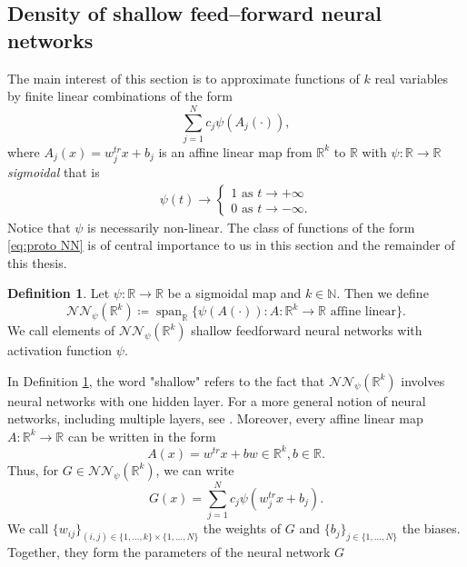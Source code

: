 \documentclass[11pt,a4paper,twoside,openany]{report}
\numberwithin{equation}{section}
\theoremstyle{plain} %
\theoremstyle{definition} %
\newtheorem{definition}[theorem]{Definition}
\theoremstyle{remark} %
\let\parencite\authnumparencite
\begin{document}
\subsection{Density of shallow feed--forward neural networks}
The main interest of this section is to approximate functions of \(k\) real variables by finite linear combinations of the form 
\begin{equation}\label{eq:proto NN}
    \sum_{j=1}^Nc_j\psi(A_j(\cdot)),
\end{equation}
where \(A_j(x)=w_j^{tr}x+b_j\) is an affine linear map from \(\mathbb{R}^k\) to \(\mathbb{R}\) with \(\psi:\mathbb{R}\to\mathbb{R}\) \textit{sigmoidal} that is
\begin{align*}
\psi(t)\to
    \begin{cases}
    1\text{ as } t\to +\infty\\
    0\text{ as } t\to -\infty.
    \end{cases}
\end{align*}
Notice that \(\psi\) is necessarily non-linear. 
The class of functions of the form \eqref{eq:proto NN} is of central importance to us in this section and the remainder of this thesis.
\begin{definition}\label{def:shallow feedforward neural networks}
    Let \(\psi:\mathbb{R}\to\mathbb{R}\) be a sigmoidal map and \(k\in\mathbb{N}\). Then we define
    \begin{equation*}
        \mathcal{NN}_{\psi}(\mathbb{R}^k)\coloneqq\operatorname{span}_{\mathbb{R}}\{\psi(A(\cdot)):A:\mathbb{R}^k\to\mathbb{R}\text{ affine linear}\}.
    \end{equation*}
    We call elements of \(\mathcal{NN}_{\psi}(\mathbb{R}^k)\) shallow feedforward neural networks with activation function \(\psi\).
\end{definition}
In Definition \ref{def:shallow feedforward neural networks}, the word "shallow" refers to the fact that \(\mathcal{NN}_{\psi}(\mathbb{R}^k)\) involves neural networks with one hidden layer. 
For a more general notion of neural networks, including multiple layers, see \parencite[Def.~4.1]{Buehler2018DeepHedging}.
Moreover, every affine linear map \(A:\mathbb{R}^k\to\mathbb{R}\) can be written in the form 
\begin{equation*}
    A(x)=w^{tr}x+b w\in\mathbb{R}^k,b\in\mathbb{R}.
\end{equation*}
Thus, for \(G\in \mathcal{NN}_{\psi}(\mathbb{R}^k)\), we can write
\begin{equation*}
    G(x)=\sum_{j=1}^Nc_j\psi(w_j^{tr}x+b_j).
\end{equation*}
We call \(\{w_{ij}\}_{(i,j)\in\{1,\dots,k\}\times\{1,\dots,N\}}\) the weights of \(G\) and \(\{b_{j}\}_{j\in \{1,\dots,N\}}\) the biases. Together, they form the parameters of the neural network \(G\)
\end{document}
